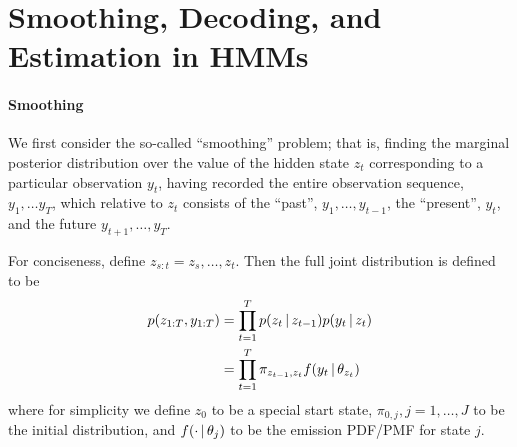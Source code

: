 \section{Smoothing, Decoding, and Estimation in HMMs}
\label{sec:smooth-decod-estim}

\paragraph{Smoothing} We first consider the so-called ``smoothing'' problem; that is,
finding the marginal posterior distribution over the value of the
hidden state $z_t$ corresponding to a particular observation $y_t$,
having recorded the entire observation sequence, $y_1, \dots y_T$,
which relative to $z_t$ consists of the ``past'', $y_1, \dots,
y_{t-1}$, the ``present'', $y_t$, and the future $y_{t+1}, \dots,
y_T$.

For conciseness, define $z_{s:t} = z_s, \dots, z_t$.  Then the full
joint distribution is defined to be
\begin{align}
  p(z_{1:T}, y_{1:T})&= \prod_{t=1}^T p(z_t \, \vert \, z_{t-1}) p(y_t
                        \, \vert \, z_t) \\
  &= \prod_{t=1}^T \pi_{z_{t-1},z_t} f(y_t \, \vert \, \theta_{z_t})
\end{align}
where for simplicity we define $z_{0}$ to be a special start state,
$\pi_{0,j}, j = 1, \dots, J$ to be the initial distribution, and
$f(\cdot \, \vert \, \theta_j)$ to be the emission PDF/PMF for state $j$.

